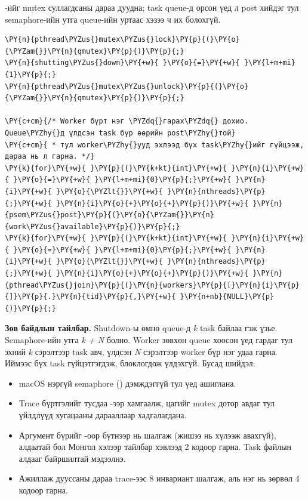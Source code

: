 \documentclass[12pt,a4paper]{article}
\begin{document}
-ийг mutex суллагдсаны дараа дуудна; task queue-д орсон үед л post хийдэг тул semaphore-ийн утга queue-ийн уртаас хэзээ ч их болохгүй.

\par\noindent\begin{minipage}{\linewidth}\setlength{\topsep}{1pt}\setlength{\partopsep}{0pt}
\label{lst:shutdown}
\begin{Verbatim}[commandchars=\\\{\}]
\PY{n}{pthread\PYZus{}mutex\PYZus{}lock}\PY{p}{(}\PY{o}{\PYZam{}}\PY{n}{qmutex}\PY{p}{)}\PY{p}{;}
\PY{n}{shutting\PYZus{}down}\PY{+w}{ }\PY{o}{=}\PY{+w}{ }\PY{l+m+mi}{1}\PY{p}{;}
\PY{n}{pthread\PYZus{}mutex\PYZus{}unlock}\PY{p}{(}\PY{o}{\PYZam{}}\PY{n}{qmutex}\PY{p}{)}\PY{p}{;}

\PY{c+cm}{/* Worker бүрт нэг \PYZdq{}гарах\PYZdq{} дохио. Queue\PYZhy{}д үлдсэн task бүр өөрийн post\PYZhy{}той}
\PY{c+cm}{ * тул worker\PYZhy{}ууд эхлээд бүх task\PYZhy{}ийг гүйцээж, дараа нь л гарна. */}
\PY{k}{for}\PY{+w}{ }\PY{p}{(}\PY{k+kt}{int}\PY{+w}{ }\PY{n}{i}\PY{+w}{ }\PY{o}{=}\PY{+w}{ }\PY{l+m+mi}{0}\PY{p}{;}\PY{+w}{ }\PY{n}{i}\PY{+w}{ }\PY{o}{\PYZlt{}}\PY{+w}{ }\PY{n}{nthreads}\PY{p}{;}\PY{+w}{ }\PY{n}{i}\PY{o}{+}\PY{o}{+}\PY{p}{)}\PY{+w}{ }\PY{n}{psem\PYZus{}post}\PY{p}{(}\PY{o}{\PYZam{}}\PY{n}{work\PYZus{}available}\PY{p}{)}\PY{p}{;}
\PY{k}{for}\PY{+w}{ }\PY{p}{(}\PY{k+kt}{int}\PY{+w}{ }\PY{n}{i}\PY{+w}{ }\PY{o}{=}\PY{+w}{ }\PY{l+m+mi}{0}\PY{p}{;}\PY{+w}{ }\PY{n}{i}\PY{+w}{ }\PY{o}{\PYZlt{}}\PY{+w}{ }\PY{n}{nthreads}\PY{p}{;}\PY{+w}{ }\PY{n}{i}\PY{o}{+}\PY{o}{+}\PY{p}{)}\PY{+w}{ }\PY{n}{pthread\PYZus{}join}\PY{p}{(}\PY{n}{workers}\PY{p}{[}\PY{n}{i}\PY{p}{]}\PY{p}{.}\PY{n}{tid}\PY{p}{,}\PY{+w}{ }\PY{n+nb}{NULL}\PY{p}{)}\PY{p}{;}
\end{Verbatim}
\end{minipage}

\textbf{Зөв байдлын тайлбар.} Shutdown-ы өмнө queue-д \textit{k} task байлаа гэж үзье. Semaphore-ийн утга \textit{k + N} болно. Worker зөвхөн queue хоосон үед гардаг тул эхний \textit{k} сэрэлтээр task авч, үлдсэн \textit{N} сэрэлтээр worker бүр нэг удаа гарна. Иймээс бүх task гүйцэтгэгдэж,  блоклогдож үлдэхгүй. Бусад шийдэл:

\begin{itemize}
  \item macOS нэргүй semaphore () дэмждэггүй тул  үед  ашиглана.
  \item Trace бүртгэлийг тусдаа -ээр хамгаалж, цагийг mutex дотор авдаг тул үйлдлүүд хугацааны дарааллаар хадгалагдана.
  \item Аргумент бүрийг -оор бүтнээр нь шалгаж (жишээ нь  хүлээж авахгүй), алдаатай бол Монгол хэлээр тайлбар хэвлээд 2 кодоор гарна. Task файлын алдааг  байршилтай мэдээлнэ.
  \item Ажиллаж дууссаны дараа trace-ээс 8 инвариант шалгаж, аль нэг нь зөрвөл 4 кодоор гарна.
\end{itemize}
\end{document}

